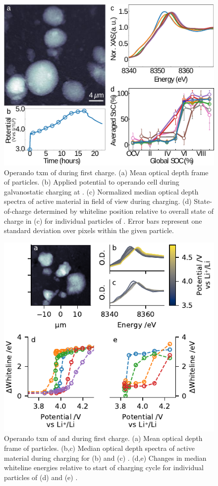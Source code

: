 \documentclass{article}
\begin{document}
\begin{figure}
  \includegraphics{figures/nca_txm.pdf}
  \caption{Operando \gls{txm} of \nca{} during first charge. (a) Mean
    optical depth frame of \nca{} particles. (b) Applied potential to
    operando cell during galvanostatic charging at . (c) Normalized median optical depth spectra of active
    material in field of view during charging. (d) State-of-charge
    determined by whiteline position relative to overall state of
    charge in (c) for individual particles of \nca{}. Error bars
    represent one standard deviation over pixels within the given
    particle.}
\end{figure}

\begin{figure}
  \includegraphics{figures/nmc_txm.pdf}
  \caption{Operando \gls{txm} of \nmc[333]{} and \nmc[532]{} during
    first charge. (a) Mean optical depth frame of \nmc[333]{}
    particles. (b,c) Median optical depth spectra of active material
    during charging for (b) \nmc[333]{} and (c) \nmc[532]{}. (d,e)
    Changes in median whiteline energies relative to start of charging
    cycle for individual particles of (d) \nmc[333] and (e)
    \nmc[532]{}.}
\end{figure}
\end{document}
